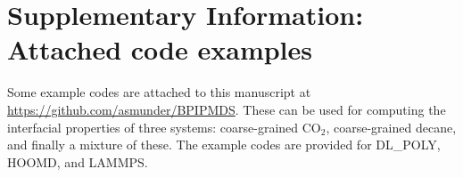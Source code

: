 \documentclass[9pt,tutorial]{livecoms}
\newcommand{\githubrepository}{\url{https://github.com/asmunder/BPIPMDS}}  %
\begin{document}
\section*{Supplementary Information: Attached code examples}
Some example codes are attached to this manuscript at \githubrepository.
These can be used for computing the interfacial properties of three systems: coarse-grained CO$_2$, coarse-grained decane, and finally a mixture of these.
The example codes are provided for DL\_POLY, HOOMD, and LAMMPS.

\end{document}
